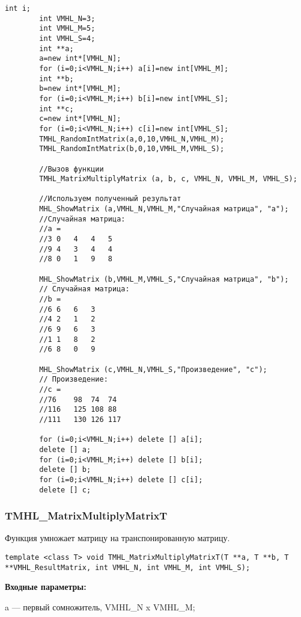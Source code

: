 \documentclass[a4paper,12pt]{article}
\begin{document}
\begin{lstlisting}[label=code_use_TMHL_MatrixMultiplyMatrix,caption=Пример использования]
        int i;
        int VMHL_N=3;
        int VMHL_M=5;
        int VMHL_S=4;
        int **a;
        a=new int*[VMHL_N];
        for (i=0;i<VMHL_N;i++) a[i]=new int[VMHL_M];
        int **b;
        b=new int*[VMHL_M];
        for (i=0;i<VMHL_M;i++) b[i]=new int[VMHL_S];
        int **c;
        c=new int*[VMHL_N];
        for (i=0;i<VMHL_N;i++) c[i]=new int[VMHL_S];
        TMHL_RandomIntMatrix(a,0,10,VMHL_N,VMHL_M);
        TMHL_RandomIntMatrix(b,0,10,VMHL_M,VMHL_S);

        //Вызов функции
        TMHL_MatrixMultiplyMatrix (a, b, c, VMHL_N, VMHL_M, VMHL_S);

        //Используем полученный результат
        MHL_ShowMatrix (a,VMHL_N,VMHL_M,"Случайная матрица", "a");
        //Случайная матрица:
        //a =
        //3	0	4	4	5
        //9	4	3	4	4
        //8	0	1	9	8

        MHL_ShowMatrix (b,VMHL_M,VMHL_S,"Случайная матрица", "b");
        // Случайная матрица:
        //b =
        //6	6	6	3
        //4	2	1	2
        //6	9	6	3
        //1	1	8	2
        //6	8	0	9

        MHL_ShowMatrix (c,VMHL_N,VMHL_S,"Произведение", "c");
        // Произведение:
        //c =
        //76	98	74	74
        //116	125	108	88
        //111	130	126	117

        for (i=0;i<VMHL_N;i++) delete [] a[i];
        delete [] a;
        for (i=0;i<VMHL_M;i++) delete [] b[i];
        delete [] b;
        for (i=0;i<VMHL_N;i++) delete [] c[i];
        delete [] c;
\end{lstlisting}

\subsubsection{TMHL\_MatrixMultiplyMatrixT}\label{TMHL_MatrixMultiplyMatrixT}

Функция умножает матрицу на транспонированную матрицу.


\begin{lstlisting}[label=code_syntax_TMHL_MatrixMultiplyMatrixT,caption=Синтаксис]
template <class T> void TMHL_MatrixMultiplyMatrixT(T **a, T **b, T **VMHL_ResultMatrix, int VMHL_N, int VMHL_M, int VMHL_S);
\end{lstlisting}

\textbf{Входные параметры:}
 
a --- первый сомножитель, VMHL\_N x VMHL\_M;
 
\end{document}
